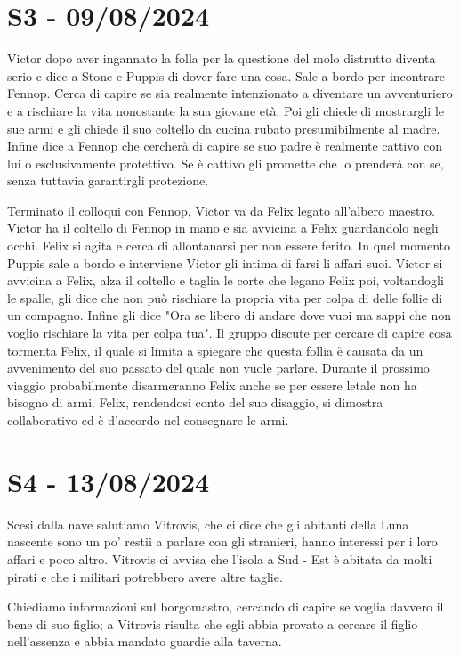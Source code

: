 \documentclass[letterpaper,twocolumn,openany, nodeprecatedcode, nomultitoc]{dndbook}
\begin{document}
\section{S3 - 09/08/2024}
Victor dopo aver ingannato la folla per la questione del molo distrutto diventa serio e dice a Stone e Puppis di dover fare una cosa. Sale a bordo per incontrare Fennop. Cerca di capire se sia realmente intenzionato a diventare un avventuriero e a rischiare la vita nonostante la sua giovane età. Poi gli chiede di mostrargli le sue armi e gli chiede il suo coltello da cucina rubato presumibilmente al madre. Infine dice a Fennop che cercherà di capire se suo padre è realmente cattivo con lui o esclusivamente protettivo. Se è cattivo gli promette che lo prenderà con se, senza tuttavia garantirgli protezione.

Terminato il colloqui con Fennop, Victor va da Felix legato all'albero maestro. Victor ha il coltello di Fennop in mano e sia avvicina a Felix guardandolo negli occhi. Felix si agita e cerca di allontanarsi per non essere ferito. In quel momento Puppis sale a bordo e interviene Victor gli intima di farsi li affari suoi. Victor si avvicina a Felix, alza il coltello e taglia le corte che legano Felix poi, voltandogli le spalle, gli dice che non può rischiare la propria vita per colpa di delle follie di un compagno. Infine gli dice "Ora se libero di andare dove vuoi ma sappi che non voglio rischiare la vita per colpa tua". Il gruppo discute per cercare di capire cosa tormenta Felix, il quale si limita a spiegare che questa follia è causata da un avvenimento del suo passato del quale non vuole parlare. Durante il prossimo viaggio probabilmente disarmeranno Felix anche se per essere letale non ha bisogno di armi. Felix, rendendosi conto del suo disaggio, si dimostra collaborativo ed è d'accordo nel consegnare le armi.

\section{S4 - 13/08/2024}
Scesi dalla nave salutiamo Vitrovis, che ci dice che gli abitanti della Luna nascente sono un po' restii a parlare con gli stranieri, hanno interessi per i loro affari e poco altro. Vitrovis ci avvisa che l'isola a Sud - Est è abitata da molti pirati e che i militari potrebbero avere altre taglie.

Chiediamo informazioni sul borgomastro, cercando di capire se voglia davvero il bene di suo figlio; a Vitrovis risulta che egli abbia provato a cercare il figlio nell'assenza e abbia mandato guardie alla taverna.
\end{document}
